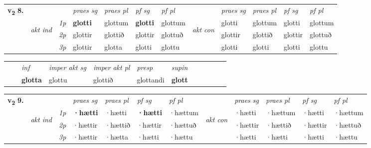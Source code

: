 \begin{tabular}{llllllllllll} \toprule
\multirow{4}{*}{{{\textbf{v{\textsubscript{2}}} \Large{\textbf{8.}}}}}  & &   &  \textit{praes sg}  & \textit{praes pl}  &\textit{ pf sg} & \textit{pf pl} &  &  \textit{praes sg}  & \textit{praes pl}  & \textit{pf sg} & \textit{pf pl } \\*
	\cmidrule{4-7} \cmidrule{9-12}
 & \multirow{3}{*}{\begin{turn}{90}\textit{akt ind}\end{turn}} & {\textit{1p}} & \textbf{glotti} & glottum    & \textbf{glotti} & glottum & \multirow{3}{*}{\begin{turn}{90}\textit{akt con}\end{turn}} &glotti & glottum & glotti & glottum\\*
& &  {\textit{2p}} &  glottir  & glottið   & glottir & glottuð & & glottir & glottið & glottir & glottuð \\*
& &  {\textit{3p}} & glottir & glotta   & glotti & glottu & & glotti & glotti& glotti & glottu  \\*
\cmidrule{4-7} \cmidrule{9-12}
\end{tabular}


\begin{tabular}{llllllllllll}
 & & \textit{inf} & \textit{imper akt sg} & \textit{imper akt pl}   & \textit{presp} & \textit{supin}       \\*
  & & \textbf{glotta} & glottu  & glottið   & glottandi &  \textbf{glott}   \\*
\cmidrule{1-12}
\end{tabular}



\begin{tabular}{llllllllllll} \toprule
\multirow{4}{*}{{{\textbf{v{\textsubscript{2}}} \Large{\textbf{9.}}}}}  & &   &  \textit{praes sg}  & \textit{praes pl}  &\textit{ pf sg} & \textit{pf pl} &  &  \textit{praes sg}  & \textit{praes pl}  & \textit{pf sg} & \textit{pf pl } \\*
	\cmidrule{4-7} \cmidrule{9-12}
 & \multirow{3}{*}{\begin{turn}{90}\textit{akt ind}\end{turn}} & {\textit{1p}} & \textbf{·hætti} & ·hætti    & \textbf{·hætti} & ·hættum & \multirow{3}{*}{\begin{turn}{90}\textit{akt con}\end{turn}} &·hætti & ·hættum & ·hætti & ·hættum\\*
& &  {\textit{2p}} &  ·hættir  & ·hættið   & ·hættir & ·hættuð & & ·hættir & ·hættið & ·hættir & ·hættuð \\*
& &  {\textit{3p}} & ·hættir & ·hætta   & ·hætti & ·hættu & & ·hætti & ·hætti& ·hætti & ·hættu  \\*
\cmidrule{4-7} \cmidrule{9-12}
\end{tabular}


